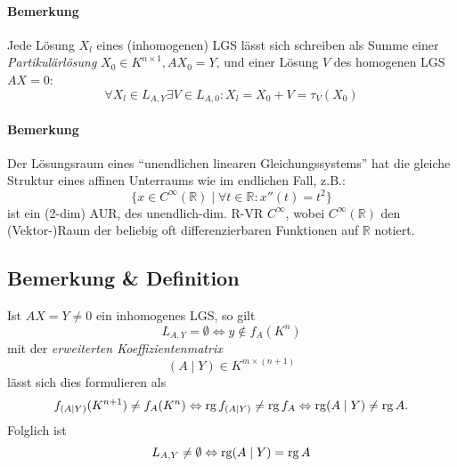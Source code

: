 \paragraph{Bemerkung}
	Jede Lösung $ X_l $ eines (inhomogenen) LGS lässt sich schreiben als Summe einer \emph{Partikulärlösung} $ X_0 \in K^{n\times 1},AX_0 = Y $, und einer Lösung $V$ des homogenen LGS $ AX = 0 $:
		\[ \forall X_l\in L_{A,Y}\exists V\in L_{A,0}:X_l=X_0+V=\tau_V(X_0) \]
\paragraph{Bemerkung}
	Der Lösungsraum eines "`unendlichen linearen Gleichungssystems"' hat die gleiche Struktur eines affinen Unterraums wie im endlichen Fall, z.B.:
		\[ \{x\in C^\infty(\mathbb{R})\mid \forall t\in \mathbb{R}:x''(t) = t^2 \} \]
	ist ein (2-dim) AUR, des unendlich-dim. R-VR $C^\infty$, wobei $ C^\infty(\mathbb{R}) $ den (Vektor-)Raum der beliebig oft differenzierbaren Funktionen auf $ \mathbb{R} $ notiert. 
\subsection{Bemerkung \& Definition}
	\begin{Definition}
	Ist $ AX=Y \neq 0$ ein inhomogenes LGS, so gilt
		\[ L_{A,Y} = \emptyset \Leftrightarrow y\notin f_A(K^n) \]
	mit der \emph{erweiterten Koeffizientenmatrix}
		\[ (A\mid Y) \in K^{m\times (n+1)} \]
	lässt sich dies formulieren als
		\[ f_{(A\mid Y)}(K^{n+1})\neq f_A(K^n) \Leftrightarrow \operatorname{rg} f_{(A\mid Y)}\neq \operatorname{rg} f_A \Leftrightarrow \operatorname{rg} (A\mid Y) \neq \operatorname{rg} A. \]
	Folglich ist
		\[ L_{A,Y} \neq \emptyset \Leftrightarrow \operatorname{rg} (A\mid Y) = \operatorname{rg} A \]
	\end{Definition}
